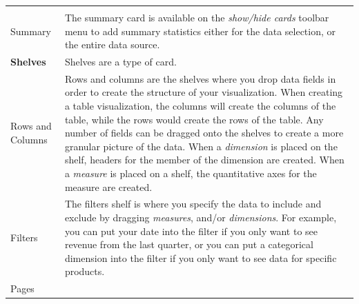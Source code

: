 \documentclass[]{book}
\begin{document}
\begin{longtable}[]{@{}ll@{}}
\begin{minipage}[t]{0.80\columnwidth}
\end{minipage}\tabularnewline
\begin{minipage}[t]{0.15\columnwidth}\raggedright
Summary\strut
\end{minipage} & \begin{minipage}[t]{0.80\columnwidth}\raggedright
The summary card is available on the \emph{show/hide cards} toolbar menu to add summary statistics either for the data selection, or the entire data source.\strut
\end{minipage}\tabularnewline
\begin{minipage}[t]{0.15\columnwidth}\raggedright
\textbf{Shelves}\strut
\end{minipage} & \begin{minipage}[t]{0.80\columnwidth}\raggedright
Shelves are a type of card.\strut
\end{minipage}\tabularnewline
\begin{minipage}[t]{0.15\columnwidth}\raggedright
Rows and Columns\strut
\end{minipage} & \begin{minipage}[t]{0.80\columnwidth}\raggedright
Rows and columns are the shelves where you drop data fields in order to create the structure of your visualization. When creating a table visualization, the columns will create the columns of the table, while the rows would create the rows of the table. Any number of fields can be dragged onto the shelves to create a more granular picture of the data. When a \emph{dimension} is placed on the shelf, headers for the member of the dimension are created. When a \emph{measure} is placed on a shelf, the quantitative axes for the measure are created.\strut
\end{minipage}\tabularnewline
\begin{minipage}[t]{0.15\columnwidth}\raggedright
Filters\strut
\end{minipage} & \begin{minipage}[t]{0.80\columnwidth}\raggedright
The filters shelf is where you specify the data to include and exclude by dragging \emph{measures}, and/or \emph{dimensions}. For example, you can put your date into the filter if you only want to see revenue from the last quarter, or you can put a categorical dimension into the filter if you only want to see data for specific products.\strut
\end{minipage}\tabularnewline
\begin{minipage}[t]{0.15\columnwidth}\raggedright
Pages\strut
\end{minipage} & \begin{minipage}[t]{0.80\columnwidth}\raggedright

\end{minipage}
\end{longtable}
\end{document}

